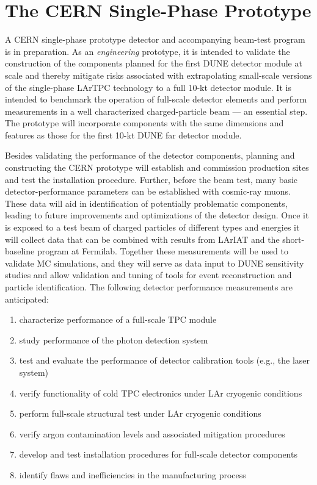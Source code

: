 \section{The CERN Single-Phase Prototype}
\label{sec:proto-cern-single}

A CERN single-phase prototype detector and accompanying beam-test
program is in preparation. As an \textit{engineering} prototype, it is
intended to validate the construction of the components planned for the
first DUNE  detector module at scale and thereby mitigate
risks associated with extrapolating small-scale versions of the
single-phase LArTPC technology to a full 10-kt detector module.  It is
intended to benchmark the operation of full-scale detector
elements and perform measurements in a well characterized
charged-particle beam --- an essential step.
%
The prototype will incorporate components with the same
dimensions and features as those for the first 10-kt DUNE far detector
module. %

Besides validating the performance of the detector components,
planning and constructing the CERN prototype will establish and
commission production sites and test the installation procedure.
Further, before the beam test, many basic detector-performance
parameters can be established with cosmic-ray muons.  These data will
aid in identification of potentially problematic components, leading
to future improvements and optimizations of the detector design.
%
Once it is exposed to a test beam of charged particles of different
types and energies it will collect data that can be combined with
results from LArIAT and the short-baseline program at Fermilab. Together
these measurements will be used to validate MC simulations, and they
will serve as data input to DUNE sensitivity studies and allow
validation and tuning of tools for event reconstruction and particle
identification.
The following detector performance measurements are anticipated:
 \begin{enumerate}
 \item characterize performance of a full-scale TPC module
 \item study performance of the photon detection system
 \item test and evaluate the performance of detector calibration tools (e.g., the laser system)
  \item verify functionality of cold TPC electronics under LAr cryogenic conditions
  \item perform full-scale structural test under LAr cryogenic conditions
  \item verify argon contamination levels and associated mitigation procedures
  \item develop and test installation procedures for full-scale detector components
  \item identify flaws and inefficiencies in the manufacturing process
\end{enumerate}


